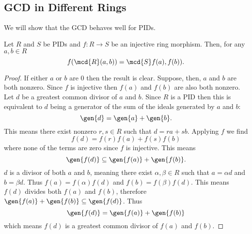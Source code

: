 \documentclass[12pt,oneside]{book}
\begin{document}
\subsection{GCD in Different Rings}
We will show that the GCD behaves well for PIDs.
\begin{lemma}
	Let \( R \) and \( S \) be PIDs and \( f \colon R \to S \) be an injective ring
	morphism. Then, for any \( a,b \in R \)
	\begin{equation*}
		f(\mcd{R}(a,b)) = \mcd{S}f(a), f(b)).
	\end{equation*}
\end{lemma}
\begin{proof}
	If either \( a \) or \( b \) are 0 then the result is clear. Suppose, then, \( a \) and
	\( b \) are both nonzero. Since \( f \) is injective then \( f(a) \) and \( f(b) \) are
	also both nonzero. Let \( d \) be a greatest common divisor of \( a \) and \( b \).
	Since \( R \) is a PID then this is equivalent to \( d \) being a generator of the sum
	of the ideals generated by \( a \) and \( b \):
	\begin{equation*}
		\gen{d} = \gen{a} + \gen{b}.
	\end{equation*}
	This means there exist nonzero \( r,s \in R \) such that \( d = ra + sb \). Applying \(
	f \) we	find
	\begin{equation*}
		f(d) = f(r)f(a) + f(s)f(b) 
	\end{equation*}
	where none of the terms are zero since \( f \) is injective. This means 
	\begin{equation*}
		\gen{f(d)} \subseteq \gen{f(a)} + \gen{f(b)}.
	\end{equation*}
	\( d \) is a divisor of both \( a \) and \( b \), meaning there exist \( \alpha, \beta
	\in R \) such that \( a = \alpha d \) and \( b = \beta d \). Thus \( f(a) =
	f(\alpha)f(d) \) and \( f(b) = f(\beta)f(d) \). This means \( f(d) \) divides both \(
	f(a) \) and \( f(b) \), therefore \( \gen{f(a)} + \gen{f(b)} \subseteq \gen{f(d)} \).
	Thus 
	\begin{equation*}
		\gen{f(d)} = \gen{f(a)} + \gen{f(b)}	
	\end{equation*}
	which means \( f(d) \) is a greatest common divisor of \( f(a) \) and \( f(b) \).
\end{proof}
\end{document}

